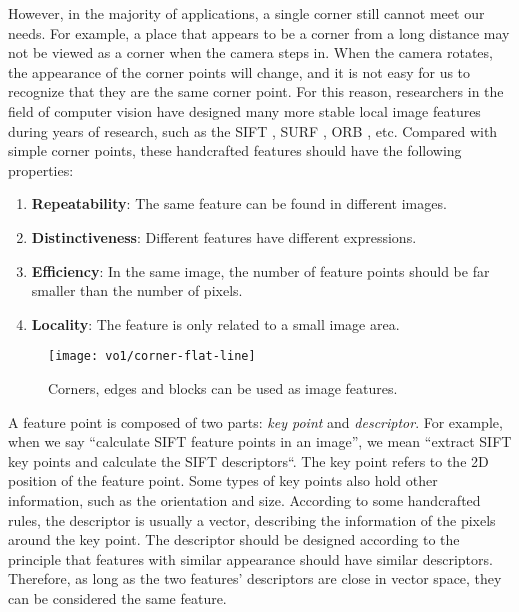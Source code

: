 However, in the majority of applications, a single corner still cannot meet our needs. For example, a place that appears to be a corner from a long distance may not be viewed as a corner when the camera steps in. When the camera rotates, the appearance of the corner points will change, and it is not easy for us to recognize that they are the same corner point. For this reason, researchers in the field of computer vision have designed many more stable local image features during years of research, such as the SIFT {\cite{Lowe2004}}, SURF {\cite{Bay2006}} , ORB {\cite{Rublee2011}}, etc. Compared with simple corner points, these handcrafted features should have the following properties:

\begin{enumerate}
\item \textbf{Repeatability}: The same feature can be found in different images.
\item \textbf{Distinctiveness}: Different features have different expressions.
\item \textbf{Efficiency}: In the same image, the number of feature points should be far smaller than the number of pixels.
\item \textbf{Locality}: The feature is only related to a small image area.
\end{enumerate}

\begin{figure}[!ht]
    \centering
    \texttt{[image: vo1/corner-flat-line]}
    \caption{Corners, edges and blocks can be used as image features.}
    \label{fig:corner-feature}
\end{figure}

A feature point is composed of two parts: \textit{key point} and \textit{descriptor}. For example, when we say ``calculate SIFT feature points in an image'', we mean ``extract SIFT key points and calculate the SIFT descriptors``. The key point refers to the 2D position of the feature point. Some types of key points also hold other information, such as the orientation and size. According to some handcrafted rules, the descriptor is usually a vector, describing the information of the pixels around the key point. The descriptor should be designed according to the principle that features with similar appearance should have similar descriptors. Therefore, as long as the two features' descriptors are close in vector space, they can be considered the same feature. 

